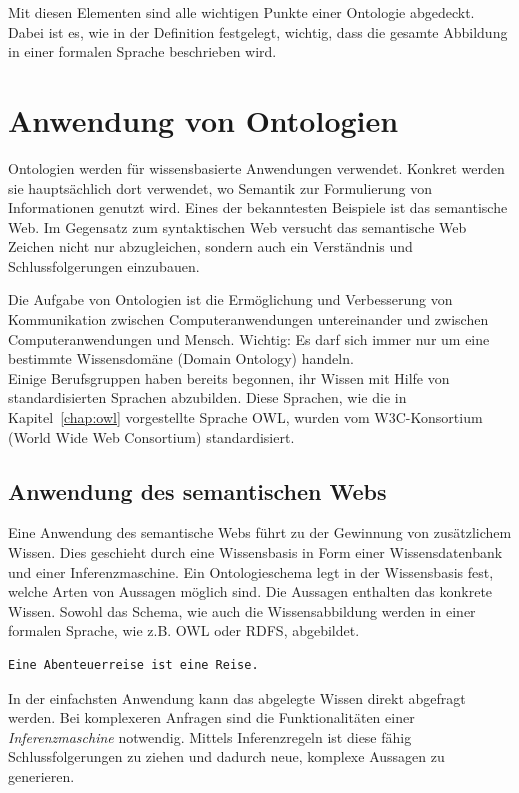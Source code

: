 Mit diesen Elementen sind alle wichtigen Punkte einer Ontologie abgedeckt. Dabei ist es, wie in der Definition festgelegt, wichtig, dass die gesamte Abbildung in einer formalen Sprache beschrieben wird.

\section{Anwendung von Ontologien}
\label{sec:ontologien_onto_anwendung}
Ontologien werden für wissensbasierte Anwendungen verwendet. Konkret werden sie hauptsächlich dort verwendet, wo Semantik zur Formulierung von Informationen genutzt wird. Eines der bekanntesten Beispiele ist das semantische Web. Im Gegensatz zum syntaktischen Web versucht das semantische Web Zeichen nicht nur abzugleichen, sondern auch ein Verständnis und Schlussfolgerungen einzubauen.

Die Aufgabe von Ontologien ist die Ermöglichung und Verbesserung von Kommunikation zwischen Computeranwendungen untereinander und zwischen Computeranwendungen und Mensch. Wichtig: Es darf sich immer nur um eine bestimmte Wissensdomäne (Domain Ontology) handeln.\\
Einige Berufsgruppen haben bereits begonnen, ihr Wissen mit Hilfe von standardisierten Sprachen abzubilden. Diese Sprachen, wie die in Kapitel~\ref{chap:owl} vorgestellte Sprache OWL, wurden vom W3C-Konsortium (World Wide Web Consortium) standardisiert.

\subsection{Anwendung des semantischen Webs}
\label{subsec:ontologien_onto_SemantikWebAnwendung}
Eine Anwendung des semantische Webs führt zu der Gewinnung von zusätzlichem Wissen. Dies geschieht durch eine Wissensbasis in Form einer Wissensdatenbank und einer Inferenzmaschine. Ein Ontologieschema legt in der Wissensbasis fest, welche Arten von Aussagen möglich sind. Die Aussagen enthalten das konkrete Wissen. Sowohl das Schema, wie auch die Wissensabbildung werden in einer formalen Sprache, wie z.B. OWL oder RDFS, abgebildet.

\begin{lstlisting}[caption={Beispiel einer Aussage in einer Wissensbasis.}]
Eine Abenteuerreise ist eine Reise.
\end{lstlisting}

In der einfachsten Anwendung kann das abgelegte Wissen direkt abgefragt werden. Bei komplexeren Anfragen sind die Funktionalitäten einer \textit{Inferenzmaschine} notwendig. Mittels Inferenzregeln ist diese fähig Schlussfolgerungen zu ziehen und dadurch neue, komplexe Aussagen zu generieren.

